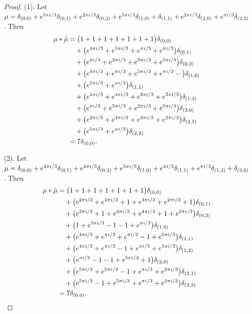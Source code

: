 \begin{proof}
(1). Let $\mu=\delta_{(0,0)}+e^{5\pi i/3}\delta_{(0,1)}+e^{2\pi i/3}\delta_{(0,2)}+e^{5\pi i/3}\delta_{(1,0)}+\delta_{(1,1)}+e^{2\pi i/3}\delta_{(2,0)}+e^{\pi i/3}\delta_{(2,2)}
$.  Then 
\begin{align*} 
\mu * \tilde \mu & = \big(1+1+1+1+1+1+1\big)\delta_{(0,0)}
\\&
\quad+\big(e^{4\pi i/3}+e^{5\pi i/3}+e^{\pi i/3}+e^{\pi i/3}\big)\delta_{(0,1)}
\\&
\quad+\big(e^{\pi i/3}+e^{2\pi i/3}+e^{5\pi i/3}+e^{5\pi i/3}\big)\delta_{(0,2)}
\\&
\quad+\big(e^{4\pi i/3}+e^{\pi i/3}+e^{5\pi i/3}+e^{\pi i/3}-\big)\delta_{(1,0)}
\\&
\quad+\big(e^{5\pi i/3}+e^{\pi i/3}\big)\delta_{(1,1)}
\\&
\quad+\big(e^{4\pi i/3}+e^{4\pi i/3}+e^{2\pi i/3}+e^{2\pi i/3}\big)\delta_{(1,2)}
\\&
\quad+\big(e^{\pi i/3}+e^{5\pi i/3}+e^{2\pi i/3}+e^{5\pi i/3}\big)\delta_{(2,0)}
\\&
\quad+\big(e^{2\pi i/3}+e^{4\pi i/3}+e^{4\pi i/3}+e^{2\pi i/3}\big)\delta_{(2,1)}
\\&
\quad+\big(e^{5\pi i/3}+e^{\pi i/3}\big)\delta_{(2,2)}\\&=7\delta_{(0 , 0)}.
\end{align*}

(2). Let
$\mu=\delta_{(0,0)}+e^{4\pi i/3}\delta_{(0,1)}+e^{4\pi i/3}\delta_{(0,2)}+e^{5\pi i/3}\delta_{(1,0)}+e^{\pi i/3}\delta_{(1,1)}+e^{\pi i/3}\delta_{(1,2)}+\delta_{(2,0)}
$.  Then 
\begin{align*} 
\mu * \tilde \mu & = \big(1+1+1+1+1+1+1\big)\delta_{(0,0)}
\\&
\quad+\big(e^{2\pi i/3}+e^{4\pi i/3}+1+e^{4\pi i/3}+e^{2\pi i/3}+1\big)\delta_{(0,1)}
\\&
\quad+\big(e^{2\pi i/3}+1+e^{4\pi i/3}+e^{4\pi i/3}+1+e^{2\pi i/3}\big)\delta_{(0,2)}
\\&
\quad+\big(1+e^{5\pi i/3}-1-1+e^{\pi i/3}\big)\delta_{(1,0)}
\\&
\quad+\big(e^{4\pi i/3}+e^{\pi i/3}+e^{\pi i/3}-1+e^{5\pi i/3}\big)\delta_{(1,1)}
\\&
\quad+\big(e^{4\pi i/3}+e^{\pi i/3}-1+e^{\pi i/3}+e^{5\pi i/3}\big)\delta_{(1,2)}
\\&
\quad+\big(e^{\pi i/3}-1-1+e^{5\pi i/3}+1\big)\delta_{(2,0)}
\\&
\quad+\big(e^{5\pi i/3}+e^{5\pi i/3}-1+e^{\pi i/3}+e^{2\pi i/3}\big)\delta_{(2,1)}
\\&
\quad+\big(e^{5\pi i/3}-1+e^{5\pi i/3}+e^{\pi i/3}+e^{2\pi i/3}\big)\delta_{(2,2)}\\&=7\delta_{(0 , 0)}.
\end{align*}
 \qedhere
\end{proof}
 

